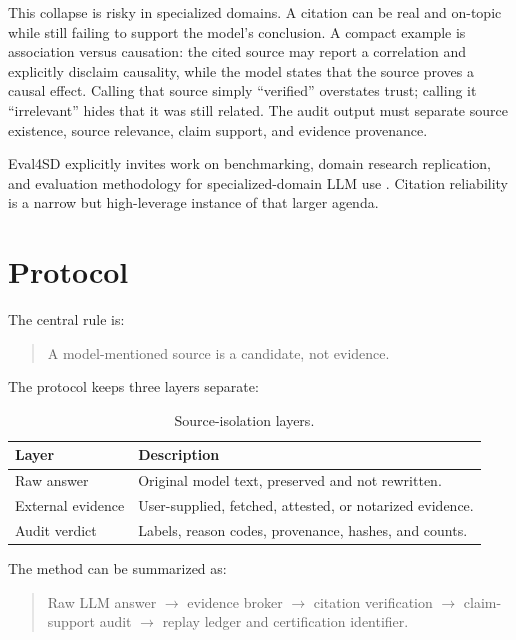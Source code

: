 \documentclass[11pt]{article}
\begin{document}
This collapse is risky in specialized domains. A citation can be real and on-topic while still failing to support the model's conclusion. A compact example is association versus causation: the cited source may report a correlation and explicitly disclaim causality, while the model states that the source proves a causal effect. Calling that source simply ``verified'' overstates trust; calling it ``irrelevant'' hides that it was still related. The audit output must separate source existence, source relevance, claim support, and evidence provenance.

Eval4SD explicitly invites work on benchmarking, domain research replication, and evaluation methodology for specialized-domain LLM use \cite{eval4sd2026cfp}. Citation reliability is a narrow but high-leverage instance of that larger agenda.

\section{Protocol}

The central rule is:

\begin{quote}
A model-mentioned source is a candidate, not evidence.
\end{quote}

The protocol keeps three layers separate:

\begin{table}[h]
\centering
\small
\begin{tabularx}{\columnwidth}{lX}
\toprule
Layer & Description \\
\midrule
Raw answer & Original model text, preserved and not rewritten. \\
External evidence & User-supplied, fetched, attested, or notarized evidence. \\
Audit verdict & Labels, reason codes, provenance, hashes, and counts. \\
\bottomrule
\end{tabularx}
\caption{Source-isolation layers.}
\label{tab:layers}
\end{table}

The method can be summarized as:

\begin{quote}
Raw LLM answer $\rightarrow$ evidence broker $\rightarrow$ citation verification $\rightarrow$ claim-support audit $\rightarrow$ replay ledger and certification identifier.
\end{quote}
\end{document}
